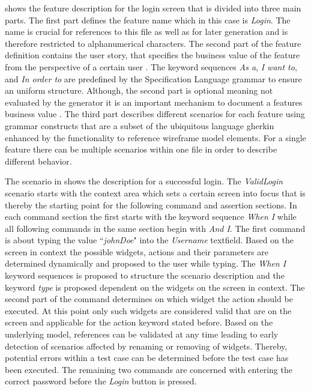 \documentclass{sig-alternate-05-2015}
\begin{document}
 shows the feature description for the login screen that is divided into three main parts. 
The first part defines the feature name which in this case is \textit{Login}.
The name is crucial for references to this file as well as for later generation and is therefore restricted to alphanumerical characters.
The second part of the feature definition contains the user story, that specifies the business value of the feature from the perspective of a certain user \cite{C.Solis.2011}.
The keyword sequences \textit{As a}, \textit{I want to}, and \textit{In order to} are predefined by the Specification Language grammar to ensure an uniform structure.
Although, the second part is optional meaning not evaluated by the generator it is an important mechanism to document a features business value \cite{RogerioAtemdeCarvalho.2010}.
The third part describes different scenarios for each feature using grammar constructs that are a subset of the ubiquitous language gherkin \cite{wynne2012cucumber} enhanced by the functionality to reference wireframe model elements.
For a single feature there can be multiple scenarios within one file in order to describe different behavior.

The scenario in  shows the description for a successful login.
The \textit{ValidLogin} scenario starts with the context area which sets a certain screen into focus that is thereby the starting point for the following command and assertion sections.
In each command section the first starts with the keyword sequence \textit{When I} while all following commands in the same section begin with \textit{And I}.
The first command is about typing the value ``\textit{johnDoe}" into the \textit{Username} textfield. 
Based on the screen in context the possible widgets, actions and their parameters are determined dynamically and proposed to the user while typing.
The \textit{When I} keyword sequences is proposed to structure the scenario description and the keyword \textit{type} is proposed dependent on the widgets on the screen in context.
The second part of the command determines on which widget the action should be executed.
At this point only such widgets are considered valid that are on the screen and applicable for the action keyword stated before.
Based on the underlying model, references can be validated at any time leading to early detection of scenarios affected by renaming or removing of widgets.
Thereby, potential errors within a test case can be determined before the test case has been executed.
The remaining two commands are concerned with entering the correct password before the \textit{Login} button is pressed.
\end{document}
